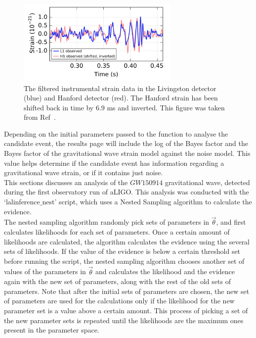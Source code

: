 \documentclass{article}
\begin{document}
 
 
 \begin{figure}[h]
 	\centering
 	\includegraphics[width=0.7\textwidth]{Figures/DataLH.png} 
 	\caption{The filtered instrumental strain data in the Livingston detector (blue) and Hanford detector (red). The Hanford strain has been shifted back in time by 6.9 ms and inverted. This figure was taken from Ref~\cite{ligo2016properties}.
 	}
 	\label{Fig:DataLH}
 \end{figure}
 
 
 Depending on the initial parameters passed to the function to analyse the candidate event, the results page will include the log of the Bayes factor and the Bayes factor of the gravitational wave strain model against the noise model. This value helps determine if the candidate event has information regarding a gravitational wave strain, or if it contains just noise. \\
 
 
 This sections discusses an analysis of the $GW150914$ gravitational wave, detected during the first observatory run of aLIGO. This analysis was conducted with the `lalinference$\_$nest' script, which uses a Nested Sampling algorithm to calculate the evidence. \\
 
 The nested sampling algorithm randomly pick sets of parameters in $\vec{\theta}$, and first calculates likelihoods for each set of parameters. Once a certain amount of likelihoods are calculated, the algorithm calculates the evidence using the several sets of likelihoods. If the value of the evidence is below a certain threshold set before running the script, the nested sampling algorithm chooses another set of values of the parameters in $\vec{\theta}$ and calculates the likelihood and the evidence again with the new set of parameters, along with the rest of the old sets of parameters. Note that after the initial sets of parameters are chosen, the new set of parameters are used for the calculations only if the likelihood for the new parameter set is a value above a certain amount. This process of picking a set of the new parameter sets is repeated until the likelihoods are the maximum ones present in the parameter space.\\
 
\end{document}
